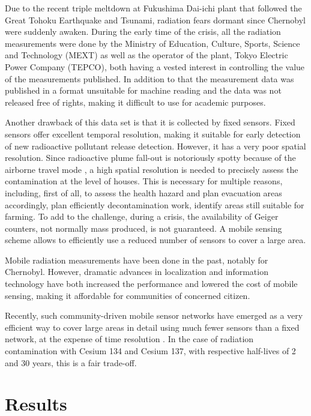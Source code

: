 \documentclass[11pt]{article}
\begin{document}
Due to the recent triple meltdown at Fukushima Dai-ichi plant that followed the
Great Tohoku Earthquake and Tsunami, radiation fears dormant since Chernobyl
were suddenly awaken.  During the early time of the crisis, all the radiation
measurements were done by the Ministry of Education, Culture, Sports, Science
and Technology (MEXT) as well as the operator of the plant, Tokyo Electric
Power Company (TEPCO), both having a vested interest in controlling the value
of the measurements published. In addition to that the measurement data was
published in a format unsuitable for machine reading and the data was not
released free of rights, making it difficult to use for academic purposes.

Another drawback of this data set is that it is collected by fixed sensors.
Fixed sensors offer excellent temporal resolution, making it suitable for
early detection of new radioactive pollutant release detection. However, it has
a very poor spatial resolution. Since radioactive plume fall-out is notoriously
spotty because of the airborne travel mode \cite{terada2008development}, a high
spatial resolution is needed to precisely assess the contamination at
the level of houses. This is necessary for multiple reasons, including, first
of all, to assess the health hazard and plan evacuation areas accordingly, plan
efficiently decontamination work, identify areas still suitable for farming.
To add to the challenge, during a crisis, the availability of Geiger counters,
not normally mass produced, is not guaranteed. A mobile sensing scheme allows
to efficiently use a reduced number of sensors to cover a large area.

Mobile radiation measurements have been done in the past, notably for
Chernobyl\cite{arvela1990mobile}. However, dramatic advances in localization
and information technology have both increased the performance and lowered the
cost of mobile sensing, making it affordable for communities of concerned
citizen.

Recently, such community-driven mobile sensor networks have emerged as a very
efficient way to cover large areas in detail using much fewer sensors than a
fixed network, at the expense of time resolution \cite{aberer2010opensense}. In
the case of radiation contamination with Cesium 134 and Cesium 137, with
respective half-lives of 2 and 30 years, this is a fair trade-off.

\section*{Results}
\label{sec:results}
\end{document}
